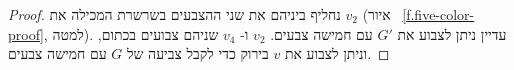 \begin{proof}
נחליף ביניהם את שני ההצבעים בשרשרת המכילה את
$v_2$
(איור%
~\ref{f.five-color-proof}, למטה).
עדיין ניתן לצבוע את
$G'$
עם חמישה צבעים.
$v_2$
ו-%
$v_4$
שניהם צבועים בכתום, וניתן לצבוע את
$v$
בירוק כדי לקבל צביעה של
$G$
עם חמישה צבעים.
\end{proof}

%
%
%
%  
%
%
%
%


